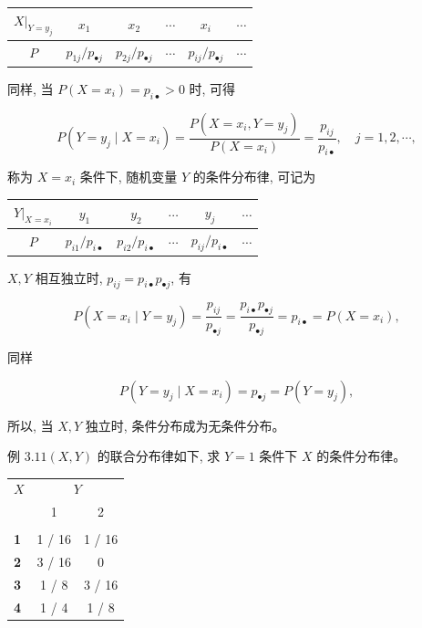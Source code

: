 \documentclass{beamer}
\begin{document}
	\begin{frame}
		\begin{tabular}{c | c c c c c}
			$\left.X\right|_{Y=y_{j}}$ & $x_{1}$ & $x_{2}$ & $\cdots$ & $x_{i}$ & $\cdots$ \\
			\hline
			$P$ & $p_{1 j} / p_{\bullet j}$ & $p_{2 j} / p_{\bullet j}$ & $\cdots$ & $p_{i j} / p_{\bullet j}$ & $\cdots$ \\
		\end{tabular}
		
		同样, 当 $P\left(X=x_{i}\right)=p_{i \bullet}>0$ 时, 可得
		
		$$
		P\left(Y=y_{j} \mid X=x_{i}\right)=\frac{P\left(X=x_{i}, Y=y_{j}\right)}{P\left(X=x_{i}\right)}=\frac{p_{i j}}{p_{i \bullet}}, \quad j=1,2, \cdots,
		$$
		
		称为 $X=x_{i}$ 条件下, 随机变量 $Y$ 的条件分布律, 可记为
		\begin{tabular}{c|ccccc}
			$\left.Y\right|_{X=x_{i}}$ & $y_{1}$ & $y_{2}$ & $\cdots$ & $y_{j}$ & $\cdots$ \\
			\hline
			$P$ & $p_{i 1} / p_{i \bullet}$ & $p_{i 2} / p_{i \bullet}$ & $\cdots$ & $p_{i j} / p_{i \bullet}$ & $\cdots$ \\
		\end{tabular}
	\end{frame}
	
	\begin{frame}
		 $X, Y$ 相互独立时, $p_{i j}=p_{i \bullet} p_{\bullet j}$, 有
		
		$$
		P\left(X=x_{i} \mid Y=y_{j}\right)=\frac{p_{i j}}{p_{\bullet j}}=\frac{p_{i \bullet} p_{\bullet j}}{p_{\bullet j}}=p_{i \bullet}=P\left(X=x_{i}\right),
		$$
		
		同样
		
		$$
		P\left(Y=y_{j} \mid X=x_{i}\right)=p_{\bullet j}=P\left(Y=y_{j}\right),
		$$
		
		所以, 当 $X, Y$ 独立时, 条件分布成为无条件分布。
	\end{frame}
	
	\begin{frame}
		例 $3.11(X, Y)$ 的联合分布律如下, 求 $Y=1$ 条件下 $X$ 的条件分布律。
		\begin{center}
			\begin{tabular}{@{}>{\bfseries}lcc@{}}
				\toprule
				$X$ & \multicolumn{2}{c}{$Y$} \\
				\cmidrule(l){2-3}
				& 1 & 2\\
				\cmidrule(r){1-1}\cmidrule(lr){2-2} \cmidrule(lr){3-3}\\
				1 & 1 / 16 & 1 / 16 \\
				2 & 3 / 16 & 0 \\
				3 & 1 / 8 & 3 / 16 \\
				4 & 1 / 4 & 1 / 8 \\
				\bottomrule
			\end{tabular}
		\end{center}
	\end{frame}
	
\end{document}
